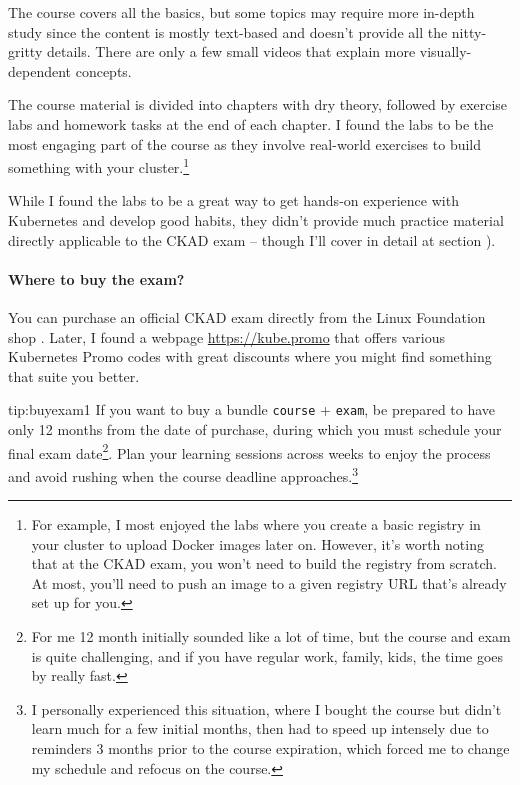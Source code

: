 The course covers all the basics, but some topics may require more in-depth study since the content is mostly text-based and doesn't provide all the nitty-gritty details. There are only a few small videos that explain more visually-dependent concepts.

The course material is divided into chapters with dry theory, followed by exercise labs and homework tasks at the end of each chapter. I found the labs to be the most engaging part of the course as they involve real-world exercises to build something with your cluster.\footnote{For example, I most enjoyed the labs where you create a basic registry in your cluster to upload Docker images later on. However, it's worth noting that at the CKAD exam, you won't need to build the registry from scratch. At most, you'll need to push an image to a given registry URL that's already set up for you.}

While I found the labs to be a great way to get hands-on experience with Kubernetes and develop good habits, they didn't provide much practice material directly applicable to the CKAD exam -- though I'll cover in detail at section ).

\paragraph{Where to buy the exam?} You can purchase an official CKAD exam directly from the Linux Foundation shop . Later, I found a webpage \url{https://kube.promo} that offers various Kubernetes Promo codes with great discounts where you might find something that suite you better.

\begin{tip}{tip:buyexam1}
	If you want to buy a bundle \texttt{course} + \texttt{exam}, be prepared to have only 12 months from the date of purchase, during which you must schedule your final exam date\footnote{For me 12 month initially sounded like a lot of time, but the course and exam is quite challenging, and if you have regular work, family, kids, the time goes by really fast.}. Plan your learning sessions across weeks to enjoy the process and avoid rushing when the course deadline approaches.\footnote{I personally experienced this situation, where I bought the course but didn't learn much for a few initial months, then had to speed up intensely due to reminders 3 months prior to the course expiration, which forced me to change my schedule and refocus on the course.}
\end{tip}

